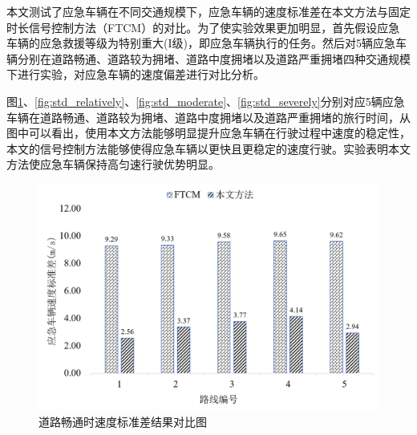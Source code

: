 本文测试了应急车辆在不同交通规模下，应急车辆的速度标准差在本文方法与固定时长信号控制方法（FTCM）的对比。为了使实验效果更加明显，首先假设应急车辆的应急救援等级为特别重大(I级)，即应急车辆执行的任务。然后对5辆应急车辆分别在道路畅通、道路较为拥堵、道路中度拥堵以及道路严重拥堵四种交通规模下进行实验，对应急车辆的速度偏差进行对比分析。


图\ref{fig:std_smooth}、\ref{fig:std_relatively}、\ref{fig:std_moderate}、\ref{fig:std_severely}分别对应5辆应急车辆在道路畅通、道路较为拥堵、道路中度拥堵以及道路严重拥堵的旅行时间，从图中可以看出，使用本文方法能够明显提升应急车辆在行驶过程中速度的稳定性，本文的信号控制方法能够使得应急车辆以更快且更稳定的速度行驶。实验表明本文方法使应急车辆保持高匀速行驶优势明显。


\begin{figure}[H]
	\centering
	\includegraphics[width=\linewidth]{figures/std_smooth.png}
	\caption{道路畅通时速度标准差结果对比图}
	\label{fig:std_smooth}
\end{figure}

